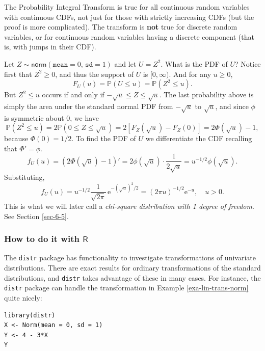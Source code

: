 \documentclass[captions=tableheading]{scrbook}
\begin{document}
\begin{fact}
The Probability Integral Transform is true for all continuous random variables with continuous CDFs, not just for those with strictly increasing CDFs (but the proof is more complicated). The transform is \textbf{not} true for discrete random variables, or for continuous random variables having a discrete component (that is, with jumps in their CDF).
\end{fact}

\begin{example}
Let \(Z\sim\mathsf{norm}(\mathtt{mean}=0,\,\mathtt{sd}=1)\) and let \(U=Z^{2}\). What is the PDF of \(U\)? 
Notice first that \(Z^{2}\geq0\), and thus the support of \(U\) is \([0,\infty)\). And for any \(u\geq0\), 
\[
F_{U}(u)=\mathbb{P}(U\leq u)=\mathbb{P}(Z^{2}\leq u).
\]
But \(Z^{2}\leq u\) occurs if and only if \(-\sqrt{u}\leq Z\leq\sqrt{u}\). The last probability above is simply the area under the standard normal PDF from \(-\sqrt{u}\) to \(\sqrt{u}\), and since \(\phi\) is symmetric about 0, we have
\[
\mathbb{P}(Z^{2}\leq u)=2\mathbb{P}(0\leq Z\leq\sqrt{u})=2\left[F_{Z}(\sqrt{u})-F_{Z}(0)\right]=2\Phi(\sqrt{u})-1,
\]
because \(\Phi(0)=1/2\). To find the PDF of \(U\) we differentiate the CDF recalling that \(\Phi'=\phi\).
\[
f_{U}(u)=\left(2\Phi(\sqrt{u})-1\right)'=2\phi(\sqrt{u})\cdot\frac{1}{2\sqrt{u}}=u^{-1/2}\phi(\sqrt{u}).
\]
Substituting,
\[
f_{U}(u)=u^{-1/2}\frac{1}{\sqrt{2\pi}}\,\mathrm{e}^{-(\sqrt{u})^{2}/2}=(2\pi u)^{-1/2}\mathrm{e}^{-u},\quad u>0.
\]
This is what we will later call a \emph{chi-square distribution with 1 degree of freedom}. See Section \ref{sec-6-5}.
\end{example}
\subsubsection{How to do it with \(\mathsf{R}\)}
\label{sec-6-4-2-1}


The \texttt{distr} package has functionality to investigate transformations of univariate distributions. There are exact results for ordinary transformations of the standard distributions, and \texttt{distr} takes advantage of these in many cases. For instance, the \texttt{distr} package can handle the transformation in Example \ref{exa-lin-trans-norm} quite nicely:


\lstset{language=R}
\begin{lstlisting}
library(distr)
X <- Norm(mean = 0, sd = 1)
Y <- 4 - 3*X
Y
\end{lstlisting}
\end{document}
